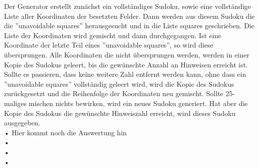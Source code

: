\documentclass[11pt,a4paper]{article}
\begin{document}
Der Generator erstellt zunächst ein vollständiges Sudoku, sowie eine vollständige Liste aller Koordinaten der besetzten Felder. Dann werden aus diesem Sudoku die die ''unavoidable squares'' herausgesucht und in die Liste squares geschrieben.
Die Liste der Koordinaten wird gemischt und dann durchgegangen. Ist eine Koordinate der letzte Teil eines ''unavoidable squares'', so wird diese übersprungen. Alle Koordinaten die nicht übersprungen werden, werden in einer Kopie des Sudokus geleert, bis die gewünschte Anzahl an Hinweisen erreicht ist. Sollte es passieren, dass keine weitere Zahl entfernt werden kann, ohne dass ein ''unavoidable squares'' vollständig geleert wird, wird die Kopie des Sudokus zurückgesetzt und die Reihenfolge der Koordinaten neu gemischt. Sollte 25-maliges mischen nichts bewirken, wird ein neues Sudoku generiert. Hat aber die Kopie des Sudokus die gewünschte Hinweiszahl erreicht, wird dieses Sudoku ausgegeben.
\ \\
• Hier kommt noch die Auswertung hin \\
•\\
•\\
•\\
\newpage
\end{document}
